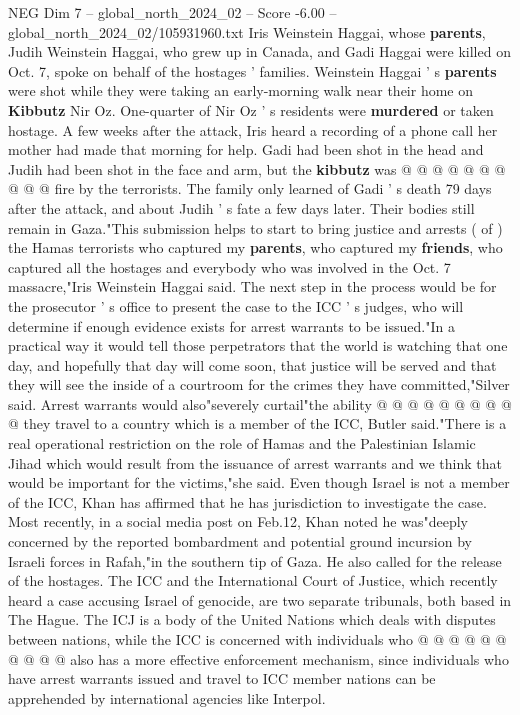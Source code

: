 \begin{textsample}{NEG Dim 7 – global\_north\_2024\_02 – Score -6.00 – global\_north\_2024\_02/105931960.txt}
Iris Weinstein Haggai, whose \textbf{parents}, Judih Weinstein Haggai, who grew up in Canada, and Gadi Haggai were killed on Oct. 7, spoke on behalf of the hostages ' families.
Weinstein Haggai ' s \textbf{parents} were shot while they were taking an early-morning walk near their home on \textbf{Kibbutz} Nir Oz.
One-quarter of Nir Oz ' s residents were \textbf{murdered} or taken hostage.
A few weeks after the attack, Iris heard a recording of a phone call her mother had made that morning for help.
Gadi had been shot in the head and Judih had been shot in the face and arm, but the \textbf{kibbutz} was @ @ @ @ @ @ @ @ @ @ fire by the terrorists.
The family only learned of Gadi ' s death 79 days after the attack, and about Judih ' s fate a few days later.
Their bodies still remain in Gaza."This submission helps to start to bring justice and arrests ( of ) the Hamas terrorists who captured my \textbf{parents}, who captured my \textbf{friends}, who captured all the hostages and everybody who was involved in the Oct. 7 massacre,"Iris Weinstein Haggai said.
The next step in the process would be for the prosecutor ' s office to present the case to the ICC ' s judges, who will determine if enough evidence exists for arrest warrants to be issued."In a practical way it would tell those perpetrators that the world is watching that one day, and hopefully that day will come soon, that justice will be served and that they will see the inside of a courtroom for the crimes they have committed,"Silver said.
Arrest warrants would also"severely curtail"the ability @ @ @ @ @ @ @ @ @ @ they travel to a country which is a member of the ICC, Butler said."There is a real operational restriction on the role of Hamas and the Palestinian Islamic Jihad which would result from the issuance of arrest warrants and we think that would be important for the victims,"she said.
Even though Israel is not a member of the ICC, Khan has affirmed that he has jurisdiction to investigate the case.
Most recently, in a social media post on Feb.12, Khan noted he was"deeply concerned by the reported bombardment and potential ground incursion by Israeli forces in Rafah,"in the southern tip of Gaza.
He also called for the release of the hostages.
The ICC and the International Court of Justice, which recently heard a case accusing Israel of genocide, are two separate tribunals, both based in The Hague.
The ICJ is a body of the United Nations which deals with disputes between nations, while the ICC is concerned with individuals who @ @ @ @ @ @ @ @ @ @ also has a more effective enforcement mechanism, since individuals who have arrest warrants issued and travel to ICC member nations can be apprehended by international agencies like Interpol.

\end{textsample}
